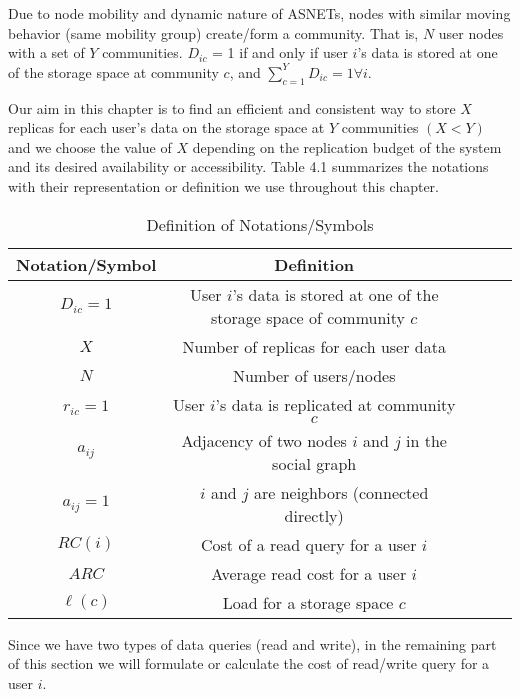 Due to node mobility and dynamic nature of ASNETs, nodes with similar moving behavior (same mobility group) create/form a community. That is, $N$ user nodes with a set of $Y$ communities. $D_{ic}$ = 1 if and only if user $i$'s data is stored at one of the storage space at community $c$, and $\sum_{c=1}^Y D_{ic} = 1 \forall i$.

Our aim in this chapter is to find an efficient and consistent way to store $X$ replicas for each user's data on the storage space at $Y$ communities $(X<Y)$ and we choose the value of $X$ depending on the replication budget of the system and its desired availability or accessibility. Table 4.1 summarizes the notations with their representation or definition we use throughout this chapter.

\begin{table}
\centering
\caption{Definition of Notations/Symbols}
\renewcommand{\arraystretch}{1.5}
\begin{tabular}{|l|l|l|l|l|}
\hline
\multicolumn{1}{c}{Notation/Symbol} & \multicolumn{1}{c}{Definition}\\
\hline
\multicolumn{1}{c}{$D_{ic} = 1$} & \multicolumn{1}{c}{User $i$'s data is stored at one of the storage space of community $c$}\\
\multicolumn{1}{c}{$X$} & \multicolumn{1}{c}{Number of replicas for each user data} \\
\multicolumn{1}{c}{$N$} & \multicolumn{1}{c}{Number of users/nodes} \\
\multicolumn{1}{c}{$r_{ic} = 1$} & \multicolumn{1}{c}{User $i$'s data is replicated at community $c$}\\
\multicolumn{1}{c}{$a_{ij}$} & \multicolumn{1}{c}{Adjacency of two nodes $i$ and $j$ in the social graph}\\
\multicolumn{1}{c}{$a_{ij} = 1$} & \multicolumn{1}{c}{$i$ and $j$ are neighbors (connected directly)}\\
\multicolumn{1}{c}{$RC(i)$} & \multicolumn{1}{c}{Cost of a read query for a user $i$}\\
\multicolumn{1}{c}{$ARC$} & \multicolumn{1}{c}{Average read cost for a user $i$}\\
\multicolumn{1}{c}{$\ell(c)$} & \multicolumn{1}{c}{Load for a storage space $c$}\\
\hline
\end{tabular}
\end{table}

Since we have two types of data queries (read and write), in the remaining part of this section we will formulate or calculate the cost of read/write query for a user $i$.

